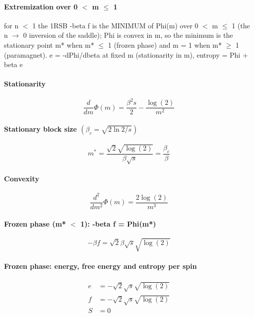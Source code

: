 \documentclass[11pt]{article}
\begin{document}
\paragraph{Extremization over 0 $<$ m $\leq$ 1}
for n $<$ 1 the 1RSB -beta f is the MINIMUM of Phi(m) over 0 $<$ m $\leq$ 1 (the n $\to$ 0 inversion of the saddle); Phi is convex in m, so the minimum is the stationary point m* when m* $\leq$ 1 (frozen phase) and m = 1 when m* $\geq$ 1 (paramagnet).  e = -dPhi/dbeta at fixed m (stationarity in m), entropy = Phi + beta e
\paragraph{Stationarity}
\begin{equation}
\frac{d}{d m} \Phi{\left(m \right)} = \frac{\beta^{2} s}{2} - \frac{\log{\left(2 \right)}}{m^{2}}
\end{equation}
\paragraph{Stationary block size $(\beta _{c} = \sqrt{2 \ln  2 / s})$}
\begin{equation}
m^{*} = \frac{\sqrt{2} \sqrt{\log{\left(2 \right)}}}{\beta \sqrt{s}} = \frac{\beta_{c}}{\beta}
\end{equation}
\paragraph{Convexity}
\begin{equation}
\frac{d^{2}}{d m^{2}} \Phi{\left(m \right)} = \frac{2 \log{\left(2 \right)}}{m^{3}}
\end{equation}
\paragraph{Frozen phase (m* $<$ 1): -beta f = Phi(m*)}
\begin{equation}
- \beta f = \sqrt{2} \beta \sqrt{s} \sqrt{\log{\left(2 \right)}}
\end{equation}
\paragraph{Frozen phase: energy, free energy and entropy per spin}
\begin{align}
e &= - \sqrt{2} \sqrt{s} \sqrt{\log{\left(2 \right)}} \\
f &= - \sqrt{2} \sqrt{s} \sqrt{\log{\left(2 \right)}} \\
S &= 0
\end{align}
\end{document}
